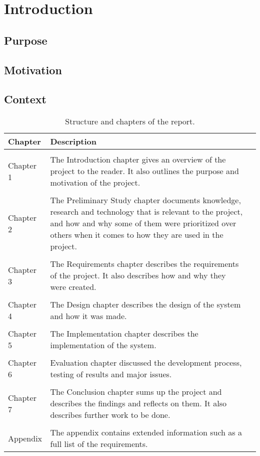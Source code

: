 
\chapter{Introduction}
\minitoc
\setcounter{page}{1}

\clearpage


\section{Purpose}

\section{Motivation}

\section{Context}
\begin{table}
\centering
\begin{tabularx}{\textwidth}{ l X l }
  \textbf{Chapter}      & \textbf{Description} \\
  \hline \\ [-1.5ex]
  Chapter 1 & The Introduction chapter gives an overview of the project to the reader. It also outlines the purpose and motivation of the project. \\
  \hline \\ [-1.5ex]
  Chapter 2 & The Preliminary Study chapter documents knowledge, research and technology that is relevant to the project, and how and why some of them were prioritized over others when it comes to how they are used in the project. \\
  \hline \\ [-1.5ex]
  Chapter 3 & The Requirements chapter describes the requirements of the project. It also describes how and why they were created. \\
  \hline \\ [-1.5ex]
  Chapter 4 & The Design chapter describes the design of the system and how it was made. \\
  \hline \\ [-1.5ex]
  Chapter 5 & The Implementation chapter describes the implementation of the system. \\
  \hline \\ [-1.5ex]
  Chapter 6 & Evaluation chapter discussed the development process, testing of results and major issues. \\
  \hline \\ [-1.5ex]
  Chapter 7 & The Conclusion chapter sums up the project and describes the findings and reflects on them. It also describes further work to be done. \\
  \hline \\ [-1.5ex]
  Appendix & The appendix contains extended information such as a full list of the requirements. \\
\end{tabularx}
\caption{Structure and chapters of the report.}
\label{table-reportstructure}
\end{table}
